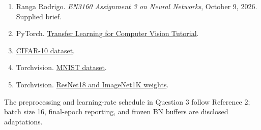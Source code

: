 \documentclass[10pt,a4paper]{article}
\providecommand{\tightlist}{\setlength{\itemsep}{0pt}\setlength{\parskip}{0pt}}
\begin{document}
\begin{enumerate}
\def\labelenumi{\arabic{enumi}.}
\tightlist
\item
  Ranga Rodrigo. \emph{EN3160 Assignment 3 on Neural Networks}, October 9, 2026. Supplied brief.
\item
  PyTorch. \href{https://docs.pytorch.org/tutorials/beginner/transfer_learning_tutorial.html}{Transfer Learning for Computer Vision Tutorial}.
\item
  \href{https://www.cs.toronto.edu/~kriz/cifar.html}{CIFAR-10 dataset}.
\item
  Torchvision. \href{https://docs.pytorch.org/vision/stable/generated/torchvision.datasets.MNIST.html}{MNIST dataset}.
\item
  Torchvision. \href{https://docs.pytorch.org/vision/stable/models/generated/torchvision.models.resnet18.html}{ResNet18 and ImageNet1K weights}.
\end{enumerate}

The preprocessing and learning-rate schedule in Question 3 follow Reference 2; batch size 16, final-epoch reporting, and frozen BN buffers are disclosed adaptations.
\end{document}
